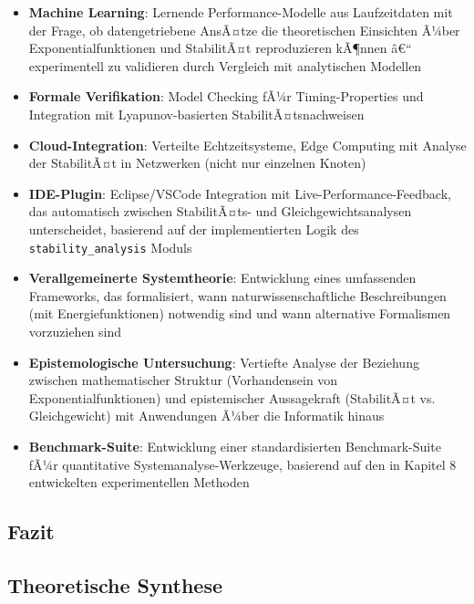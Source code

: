 ﻿\documentclass[a4paper,12pt]{report}
\theoremstyle{definition}
\begin{document}
\begin{itemize}
	\item[-] \textbf{Machine Learning}: Lernende Performance-Modelle aus Laufzeitdaten mit der Frage, ob datengetriebene AnsÃ¤tze die theoretischen Einsichten Ã¼ber Exponentialfunktionen und StabilitÃ¤t reproduzieren kÃ¶nnen â€“ experimentell zu validieren durch Vergleich mit analytischen Modellen
	
	\item[-] \textbf{Formale Verifikation}: Model Checking fÃ¼r Timing-Properties und Integration mit Lyapunov-basierten StabilitÃ¤tsnachweisen
	
	\item[-] \textbf{Cloud-Integration}: Verteilte Echtzeitsysteme, Edge Computing mit Analyse der StabilitÃ¤t in Netzwerken (nicht nur einzelnen Knoten)
	
	\item[-] \textbf{IDE-Plugin}: Eclipse/VSCode Integration mit Live-Performance-Feedback, das automatisch zwischen StabilitÃ¤ts- und Gleichgewichtsanalysen unterscheidet, basierend auf der implementierten Logik des \texttt{stability\_analysis} Moduls
	
	\item[-] \textbf{Verallgemeinerte Systemtheorie}: Entwicklung eines umfassenden Frameworks, das formalisiert, wann naturwissenschaftliche Beschreibungen (mit Energiefunktionen) notwendig sind und wann alternative Formalismen vorzuziehen sind
	
	\item[-] \textbf{Epistemologische Untersuchung}: Vertiefte Analyse der Beziehung zwischen mathematischer Struktur (Vorhandensein von Exponentialfunktionen) und epistemischer Aussagekraft (StabilitÃ¤t vs. Gleichgewicht) mit Anwendungen Ã¼ber die Informatik hinaus
	
	\item[-] \textbf{Benchmark-Suite}: Entwicklung einer standardisierten Benchmark-Suite fÃ¼r quantitative Systemanalyse-Werkzeuge, basierend auf den in Kapitel 8 entwickelten experimentellen Methoden
\end{itemize}

\subsection{Fazit}
\label{subsec:fazit}

\subsection{Theoretische Synthese}
\end{document}
